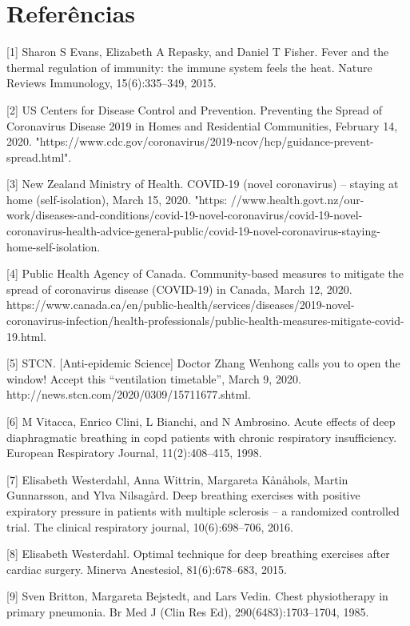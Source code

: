 \documentclass[onecolumn,journal]{IEEEtran}
\begin{document}
\begin{multicols}{2}
\end{multicols}


\section*{Referências}

[1] Sharon S Evans, Elizabeth A Repasky, and Daniel T Fisher. Fever and the thermal regulation of immunity: the immune system feels the heat. Nature Reviews Immunology, 15(6):335–349, 2015.

[2] US Centers for Disease Control and Prevention. Preventing the Spread of Coronavirus Disease 2019 in Homes and Residential Communities, February 14, 2020. "https://www.cdc.gov/coronavirus/2019-ncov/hcp/guidance-prevent-spread.html".

[3] New Zealand Ministry of Health. COVID-19 (novel coronavirus) – staying at home (self-isolation), March 15, 2020. "https: //www.health.govt.nz/our-work/diseases-and-conditions/covid-19-novel-coronavirus/covid-19-novel-coronavirus-health-advice-general-public/covid-19-novel-coronavirus-staying-home-self-isolation.

[4] Public Health Agency of Canada. Community-based measures to mitigate the spread of coronavirus disease (COVID-19) in Canada, March 12, 2020. https://www.canada.ca/en/public-health/services/diseases/2019-novel-coronavirus-infection/health-professionals/public-health-measures-mitigate-covid-19.html.

[5] STCN. [Anti-epidemic Science] Doctor Zhang Wenhong calls you to open the window! Accept this “ventilation timetable”, March 9, 2020. http://news.stcn.com/2020/0309/15711677.shtml.

[6] M Vitacca, Enrico Clini, L Bianchi, and N Ambrosino. Acute effects of deep diaphragmatic breathing in copd patients with chronic respiratory insufficiency. European Respiratory Journal, 11(2):408–415, 1998.

[7] Elisabeth Westerdahl, Anna Wittrin, Margareta Kånåhols, Martin Gunnarsson, and Ylva Nilsagård. Deep breathing exercises with positive expiratory pressure in patients with multiple sclerosis – a randomized controlled trial. The clinical respiratory journal, 10(6):698–706, 2016.

[8] Elisabeth Westerdahl. Optimal technique for deep breathing exercises after cardiac surgery. Minerva Anestesiol, 81(6):678–683, 2015.

[9] Sven Britton, Margareta Bejstedt, and Lars Vedin. Chest physiotherapy in primary pneumonia. Br Med J (Clin Res Ed), 290(6483):1703–1704, 1985.
\end{document}
